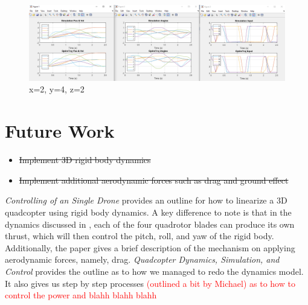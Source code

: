 \documentclass[12pt]{article}
\begin{document}
\begin{figure}[H]
\centerline{\includegraphics[scale=0.45]{2_4_2.PNG}}
  \caption{\label{2_4_2} x=2, y=4, z=2}
  \label{fig}
\end{figure}


\section{Future Work}

\begin{itemize}
  \item \sout{Implement 3D rigid body dynamics}
  \item \sout{Implement additional aerodynamic forces such as drag and ground effect}
\end{itemize}
\textit{Controlling of an Single Drone}\cite{Controlling of an Single Drone} provides an outline for how to linearize a 3D quadcopter using rigid body dynamics. A key difference to note is that in the dynamics discussed in {\cite{Controlling of an Single Drone}, each of the four quadrotor blades can produce its own thrust, which will then control the pitch, roll, and yaw of the rigid body. Additionally, the paper gives a brief description of the mechanism on applying aerodynamic forces, namely, drag.}
\newline
\newline
\textit{Quadcopter Dynamics, Simulation, and Control}\cite{QDSC} provides the outline as to how we managed to redo the dynamics model. It also gives us step by step processes  \textcolor{red}{(outlined a bit by Michael) as to how to control the power and blahh blahh blahh}

\clearpage
\end{document}
